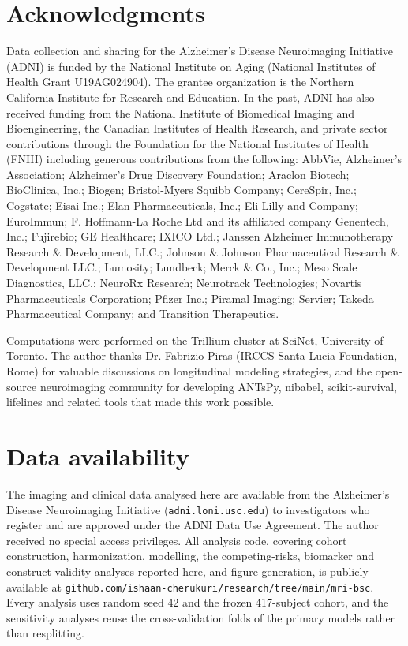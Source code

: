 \documentclass[blue]{ludusofficial}  %
\begin{document}
\section*{Acknowledgments}

Data collection and sharing for the Alzheimer's Disease Neuroimaging Initiative (ADNI) is funded by the National Institute on Aging (National Institutes of Health Grant U19AG024904). The grantee organization is the Northern California Institute for Research and Education. In the past, ADNI has also received funding from the National Institute of Biomedical Imaging and Bioengineering, the Canadian Institutes of Health Research, and private sector contributions through the Foundation for the National Institutes of Health (FNIH) including generous contributions from the following: AbbVie, Alzheimer's Association; Alzheimer's Drug Discovery Foundation; Araclon Biotech; BioClinica, Inc.; Biogen; Bristol-Myers Squibb Company; CereSpir, Inc.; Cogstate; Eisai Inc.; Elan Pharmaceuticals, Inc.; Eli Lilly and Company; EuroImmun; F. Hoffmann-La Roche Ltd and its affiliated company Genentech, Inc.; Fujirebio; GE Healthcare; IXICO Ltd.; Janssen Alzheimer Immunotherapy Research \& Development, LLC.; Johnson \& Johnson Pharmaceutical Research \& Development LLC.; Lumosity; Lundbeck; Merck \& Co., Inc.; Meso Scale Diagnostics, LLC.; NeuroRx Research; Neurotrack Technologies; Novartis Pharmaceuticals Corporation; Pfizer Inc.; Piramal Imaging; Servier; Takeda Pharmaceutical Company; and Transition Therapeutics.

Computations were performed on the Trillium cluster at SciNet, University of Toronto. The author thanks Dr. Fabrizio Piras (IRCCS Santa Lucia Foundation, Rome) for valuable discussions on longitudinal modeling strategies, and the open-source neuroimaging community for developing ANTsPy, nibabel, scikit-survival, lifelines and related tools that made this work possible.

\section*{Data availability}

The imaging and clinical data analysed here are available from the Alzheimer's Disease Neuroimaging Initiative (\texttt{adni.loni.usc.edu}) to investigators who register and are approved under the ADNI Data Use Agreement. The author received no special access privileges. All analysis code, covering cohort construction, harmonization, modelling, the competing-risks, biomarker and construct-validity analyses reported here, and figure generation, is publicly available at \texttt{github.com/ishaan-cherukuri/research/tree/main/mri-bsc}. Every analysis uses random seed 42 and the frozen 417-subject cohort, and the sensitivity analyses reuse the cross-validation folds of the primary models rather than resplitting.
\end{document}
